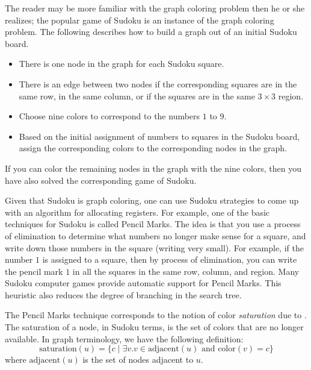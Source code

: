 \documentclass[11pt]{book}
\begin{document}
The reader may be more familiar with the graph coloring problem then he
or she realizes; the popular game of Sudoku is an instance of the
graph coloring problem. The following describes how to build a graph
out of an initial Sudoku board.
\begin{itemize}
\item There is one node in the graph for each Sudoku square.
\item There is an edge between two nodes if the corresponding squares
  are in the same row, in the same column, or if the squares are in
  the same $3\times 3$ region.
\item Choose nine colors to correspond to the numbers $1$ to $9$.
\item Based on the initial assignment of numbers to squares in the
  Sudoku board, assign the corresponding colors to the corresponding
  nodes in the graph.
\end{itemize}
If you can color the remaining nodes in the graph with the nine
colors, then you have also solved the corresponding game of Sudoku.

Given that Sudoku is graph coloring, one can use Sudoku strategies to
come up with an algorithm for allocating registers. For example, one
of the basic techniques for Sudoku is called Pencil Marks. The idea is
that you use a process of elimination to determine what numbers no
longer make sense for a square, and write down those numbers in the
square (writing very small). For example, if the number $1$ is
assigned to a square, then by process of elimination, you can write
the pencil mark $1$ in all the squares in the same row, column, and
region. Many Sudoku computer games provide automatic support for
Pencil Marks. This heuristic also reduces the degree of branching in
the search tree.

The Pencil Marks technique corresponds to the notion of color
\emph{saturation} due to \cite{Brelaz:1979eu}.  The saturation of a
node, in Sudoku terms, is the set of colors that are no longer
available. In graph terminology, we have the following definition:
\begin{equation*}
  \mathrm{saturation}(u) = \{ c \;|\; \exists v. v \in \mathrm{adjacent}(u) 
     \text{ and } \mathrm{color}(v) = c \}
\end{equation*}
where $\mathrm{adjacent}(u)$ is the set of nodes adjacent to $u$.
\end{document}
